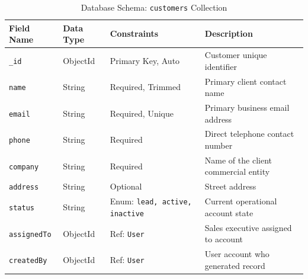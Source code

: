 \begin{table}[h!]
\centering
\caption{Database Schema: \texttt{customers} Collection}
\label{tab:schema_customer}
\renewcommand{\arraystretch}{1.2}
\begin{tabular}{|p{3cm}|p{3cm}|p{3.5cm}|p{4.5cm}|}
\hline
\textbf{Field Name} & \textbf{Data Type} & \textbf{Constraints} & \textbf{Description} \\ \hline
\texttt{\_id} & ObjectId & Primary Key, Auto & Customer unique identifier \\ \hline
\texttt{name} & String & Required, Trimmed & Primary client contact name \\ \hline
\texttt{email} & String & Required, Unique & Primary business email address \\ \hline
\texttt{phone} & String & Required & Direct telephone contact number \\ \hline
\texttt{company} & String & Required & Name of the client commercial entity \\ \hline
\texttt{address} & String & Optional & Street address \\ \hline
\texttt{status} & String & Enum: \texttt{lead, active, inactive} & Current operational account state \\ \hline
\texttt{assignedTo} & ObjectId & Ref: \texttt{User} & Sales executive assigned to account \\ \hline
\texttt{createdBy} & ObjectId & Ref: \texttt{User} & User account who generated record \\ \hline
\end{tabular}
\end{table}

